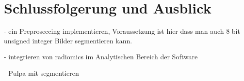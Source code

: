 \chapter{Schlussfolgerung und Ausblick}
\label{chap:schlussfolgerung}

- ein Preproseccing implementieren, Voraussetzung ist hier dass man auch 8 bit unsigned
integer Bilder segmentieren kann.

- integrieren von radiomics im Analytischen Bereich der Software

- Pulpa mit segmentieren